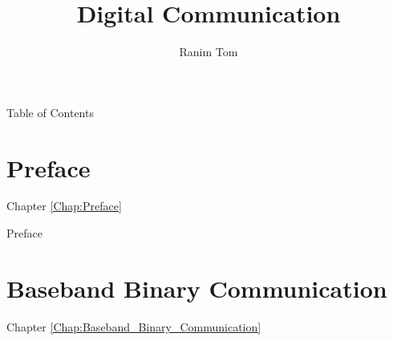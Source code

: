 \documentclass{Beamer}
\title[Acronym]{Digital Communication}
\author{Ranim Tom}
\date[]
\begin{document}

\begin{frame}
\titlepage
\end{frame}

\begin{frame}[t,allowframebreaks]{Table of Contents}
\tableofcontents
\end{frame}





\section{Preface}
\label{Chap:Preface}
\begin{frame}[t]{Chapter \autoref{Chap:Preface}}
\tableofcontents[sections= \value{section}]
\end{frame}

\begin{frame}[t]{Preface}


\end{frame}


\section{Baseband Binary Communication}
\label{Chap:Baseband_Binary_Communication}
\begin{frame}[t]{Chapter \autoref{Chap:Baseband_Binary_Communication}}
\tableofcontents[sections= \value{section}]
\end{frame}
\end{document}
